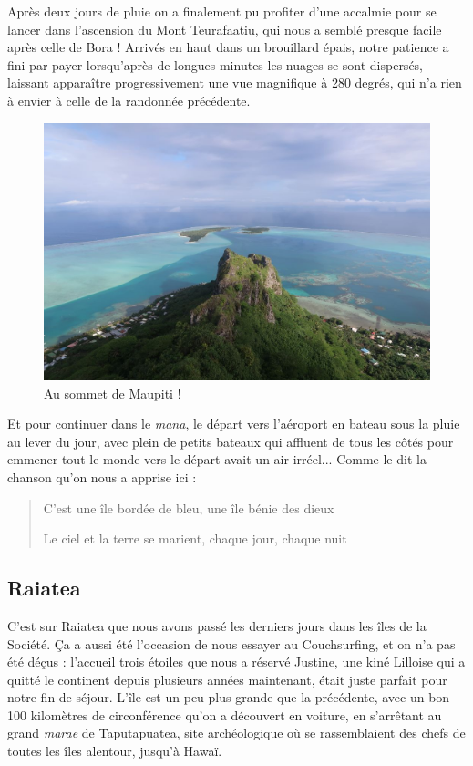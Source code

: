 Après deux jours de pluie on a finalement pu profiter d'une accalmie
pour se lancer dans l'ascension du Mont Teurafaatiu, qui nous a semblé
presque facile après celle de Bora ! Arrivés en haut dans un brouillard
épais, notre patience a fini par payer lorsqu'après de longues minutes
les nuages se sont dispersés, laissant apparaître progressivement une
vue magnifique à 280 degrés, qui n'a rien à envier à celle de la
randonnée précédente.

\begin{figure}
\centering
\includegraphics{images/20180820_maupitisommet.JPG}
\caption{Au sommet de Maupiti !}
\end{figure}

Et pour continuer dans le \emph{mana}, le départ vers l'aéroport en
bateau sous la pluie au lever du jour, avec plein de petits bateaux qui
affluent de tous les côtés pour emmener tout le monde vers le départ
avait un air irréel... Comme le dit la chanson qu'on nous a apprise ici
:

\begin{quote}
C'est une île bordée de bleu, une île bénie des dieux

Le ciel et la terre se marient, chaque jour, chaque nuit
\end{quote}

\hypertarget{raiatea}{%
\subsection{Raiatea}\label{raiatea}}

C'est sur Raiatea que nous avons passé les derniers jours dans les îles
de la Société. Ça a aussi été l'occasion de nous essayer au
Couchsurfing, et on n'a pas été déçus : l'accueil trois étoiles que nous
a réservé Justine, une kiné Lilloise qui a quitté le continent depuis
plusieurs années maintenant, était juste parfait pour notre fin de
séjour. L'île est un peu plus grande que la précédente, avec un bon 100
kilomètres de circonférence qu'on a découvert en voiture, en s'arrêtant
au grand \emph{marae} de Taputapuatea, site archéologique où se
rassemblaient des chefs de toutes les îles alentour, jusqu'à Hawaï.

